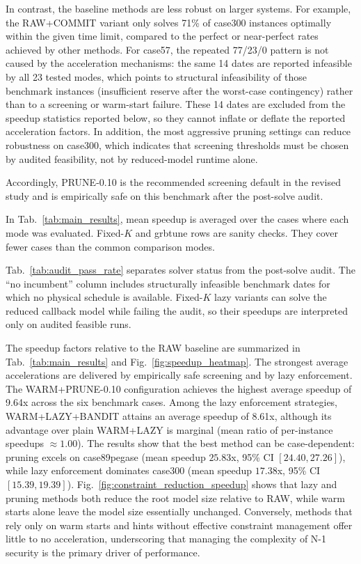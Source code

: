 \documentclass[runningheads]{llncs}
\begin{document}
In contrast, the baseline methods are less robust on larger systems. For example, the RAW+COMMIT variant only solves 71\% of case300 instances optimally within the given time limit, compared to the perfect or near-perfect rates achieved by other methods. For case57, the repeated 77/23/0 pattern is not caused by the acceleration mechanisms: the same 14 dates are reported infeasible by all 23 tested modes, which points to structural infeasibility of those benchmark instances (insufficient reserve after the worst-case contingency) rather than to a screening or warm-start failure. These 14 dates are excluded from the speedup statistics reported below, so they cannot inflate or deflate the reported acceleration factors. In addition, the most aggressive pruning settings can reduce robustness on case300, which indicates that screening thresholds must be chosen by audited feasibility, not by reduced-model runtime alone.

Accordingly, PRUNE-0.10 is the recommended screening default in the revised study and is empirically safe on this benchmark after the post-solve audit.



In Tab.~\ref{tab:main_results}, mean speedup is averaged over the cases where each mode was evaluated. Fixed-$K$ and grbtune rows are sanity checks. They cover fewer cases than the common comparison modes.



Tab.~\ref{tab:audit_pass_rate} separates solver status from the post-solve audit. The ``no incumbent'' column includes structurally infeasible benchmark dates for which no physical schedule is available. Fixed-$K$ lazy variants can solve the reduced callback model while failing the audit, so their speedups are interpreted only on audited feasible runs.

The speedup factors relative to the RAW baseline are summarized in Tab.~\ref{tab:main_results} and Fig.~\ref{fig:speedup_heatmap}. The strongest average accelerations are delivered by empirically safe screening and by lazy enforcement. The WARM+PRUNE-0.10 configuration achieves the highest average speedup of 9.64x across the six benchmark cases. Among the lazy enforcement strategies, WARM+LAZY+BANDIT attains an average speedup of 8.61x, although its advantage over plain WARM+LAZY is marginal (mean ratio of per-instance speedups $\approx 1.00$). The results show that the best method can be case-dependent: pruning excels on case89pegase (mean speedup $25.83$x, 95\% CI $[24.40, 27.26]$), while lazy enforcement dominates case300 (mean speedup $17.38$x, 95\% CI $[15.39, 19.39]$). Fig.~\ref{fig:constraint_reduction_speedup} shows that lazy and pruning methods both reduce the root model size relative to RAW, while warm starts alone leave the model size essentially unchanged. Conversely, methods that rely only on warm starts and hints without effective constraint management offer little to no acceleration, underscoring that managing the complexity of N-1 security is the primary driver of performance.
\end{document}

